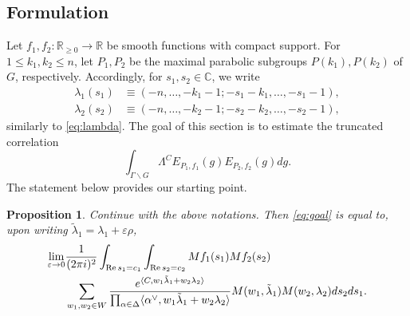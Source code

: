 \documentclass[11pt]{amsart}
\def\R{\mathbb{R}}
\newtheorem{proposition}[theorem]{Proposition}
\numberwithin{theorem}{section}
\numberwithin{equation}{section}
\theoremstyle{remark}
\theoremstyle{definition}
\newcommand{\C}{\mathbb{C}}
\newcommand{\re}{\mathrm{Re}\,}
\begin{document}
\subsection{Formulation}
Let $f_1,f_2:\R_{\geq 0} \rightarrow \R$ be smooth functions with compact support. For $1 \leq k_1,k_2 \leq n$, let $P_1,P_2$ be the maximal parabolic subgroups $P(k_1),P(k_2)$ of $G$, respectively. Accordingly, for $s_1,s_2 \in \C$, we write
\begin{align*}
\lambda_1(s_1) &\equiv (-n, \ldots, -k_1-1; -s_1-k_1, \ldots, -s_1-1), \\
\lambda_2(s_2) &\equiv (-n, \ldots, -k_2-1; -s_2-k_2, \ldots, -s_2-1),
\end{align*}
similarly to \eqref{eq:lambda}.
The goal of this section is to estimate the truncated correlation
\begin{equation} \label{eq:goal}
\int_{\Gamma\backslash G} \Lambda^C E_{P_1,f_1}(g)E_{P_2,f_2}(g) dg.
\end{equation}
The statement below provides our starting point.
\begin{proposition} \label{prop:formulation}
Continue with the above notations.
Then \eqref{eq:goal} is equal to, upon writing
$\tilde\lambda_1 = \lambda_1 + \varepsilon\rho$,
\begin{align} \label{eq:theexp'}
\lim_{\varepsilon\rightarrow 0}&\frac{1}{(2\pi i)^2}\int_{\re s_1 = c_1}\int_{\re s_2 = c_2} Mf_1(s_1)Mf_2(s_2) \\
&\sum_{w_1,w_2 \in W} \frac{e^{\langle C, w_1\tilde\lambda_1+w_2\lambda_2 \rangle}}{\prod_{\alpha \in \Delta}\langle \alpha^\vee, w_1\tilde\lambda_1 + w_2\lambda_2 \rangle} M(w_1,\tilde\lambda_1)M(w_2,\lambda_2) ds_2 ds_1.\notag
\end{align}
\end{proposition}
\end{document}
